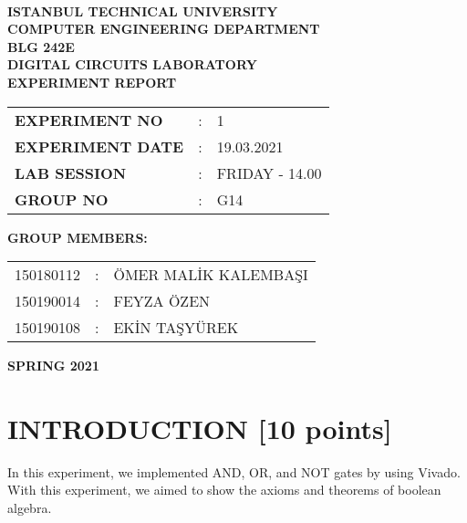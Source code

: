 \documentclass[pdftex,12pt,a4paper]{article}
\begin{document}
\begin{titlepage}
\begin{center}
\textbf{}\\
\textbf{\Large{ISTANBUL TECHNICAL UNIVERSITY}}\\
\vspace{0.5cm}
\textbf{\Large{COMPUTER ENGINEERING DEPARTMENT}}\\
\vspace{2cm}
\textbf{\Large{BLG 242E\\ DIGITAL CIRCUITS LABORATORY\\ EXPERIMENT REPORT}}\\
\vspace{2.8cm}
\begin{table}[ht]
\centering
\Large{
\begin{tabular}{lcl}
\textbf{EXPERIMENT NO}  & : & 1 \\
\textbf{EXPERIMENT DATE}  & : & 19.03.2021 \\
\textbf{LAB SESSION}  & : & FRIDAY - 14.00 \\
\textbf{GROUP NO}  & : & G14 \\
\end{tabular}}
\end{table}
\vspace{1cm}
\textbf{\Large{GROUP MEMBERS:}}\\
\begin{table}[ht]
\centering
\Large{
\begin{tabular}{rcl}
150180112  & : & ÖMER MALİK KALEMBAŞI \\
150190014  & : & FEYZA ÖZEN \\
150190108  & : & EKİN TAŞYÜREK \\
\end{tabular}}
\end{table}
\vspace{2.8cm}
\textbf{\Large{SPRING 2021}}

\end{center}

\end{titlepage}

\thispagestyle{empty}
\setcounter{tocdepth}{4}
\tableofcontents
\clearpage

\setcounter{page}{1}

\section{INTRODUCTION [10 points]}
In this experiment, we implemented AND, OR, and NOT gates by using Vivado. With this experiment, we aimed to show the axioms and theorems of boolean algebra. 
\end{document}
